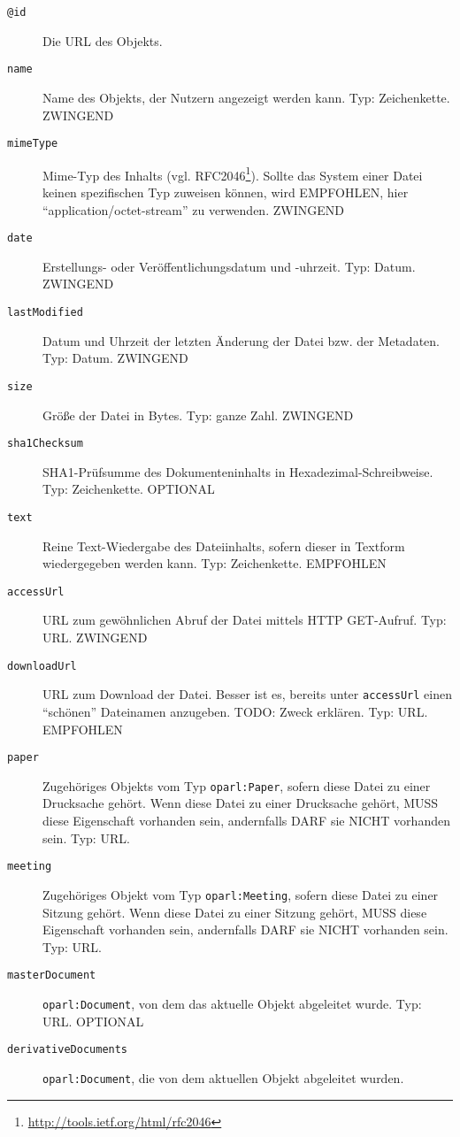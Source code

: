 \documentclass[,a4paper]{article}
\begin{document}
\begin{description}
\item[\texttt{@id}]
Die URL des Objekts.
\item[\texttt{name}]
Name des Objekts, der Nutzern angezeigt werden kann. Typ: Zeichenkette.
ZWINGEND
\item[\texttt{mimeType}]
Mime-Typ des Inhalts (vgl. RFC2046\footnote{\url{http://tools.ietf.org/html/rfc2046}}).
Sollte das System einer Datei keinen spezifischen Typ zuweisen können,
wird EMPFOHLEN, hier ``application/octet-stream'' zu verwenden. ZWINGEND
\item[\texttt{date}]
Erstellungs- oder Veröffentlichungsdatum und -uhrzeit. Typ: Datum.
ZWINGEND
\item[\texttt{lastModified}]
Datum und Uhrzeit der letzten Änderung der Datei bzw. der Metadaten.
Typ: Datum. ZWINGEND
\item[\texttt{size}]
Größe der Datei in Bytes. Typ: ganze Zahl. ZWINGEND
\item[\texttt{sha1Checksum}]
SHA1-Prüfsumme des Dokumenteninhalts in Hexadezimal-Schreibweise. Typ:
Zeichenkette. OPTIONAL
\item[\texttt{text}]
Reine Text-Wiedergabe des Dateiinhalts, sofern dieser in Textform
wiedergegeben werden kann. Typ: Zeichenkette. EMPFOHLEN
\item[\texttt{accessUrl}]
URL zum gewöhnlichen Abruf der Datei mittels HTTP GET-Aufruf. Typ: URL.
ZWINGEND
\item[\texttt{downloadUrl}]
URL zum Download der Datei. Besser ist es, bereits unter
\texttt{accessUrl} einen ``schönen'' Dateinamen anzugeben. TODO: Zweck
erklären. Typ: URL. EMPFOHLEN
\item[\texttt{paper}]
Zugehöriges Objekts vom Typ \texttt{oparl:Paper}, sofern diese Datei zu
einer Drucksache gehört. Wenn diese Datei zu einer Drucksache gehört,
MUSS diese Eigenschaft vorhanden sein, andernfalls DARF sie NICHT
vorhanden sein. Typ: URL.
\item[\texttt{meeting}]
Zugehöriges Objekt vom Typ \texttt{oparl:Meeting}, sofern diese Datei zu
einer Sitzung gehört. Wenn diese Datei zu einer Sitzung gehört, MUSS
diese Eigenschaft vorhanden sein, andernfalls DARF sie NICHT vorhanden
sein. Typ: URL.
\item[\texttt{masterDocument}]
\texttt{oparl:Document}, von dem das aktuelle Objekt abgeleitet wurde.
Typ: URL. OPTIONAL
\item[\texttt{derivativeDocuments}]
\texttt{oparl:Document}, die von dem aktuellen Objekt abgeleitet wurden.

\end{description}
\end{document}
